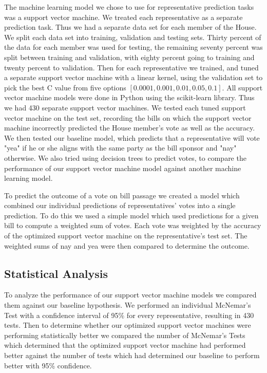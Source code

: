 \documentclass[11pt,letterpaper,twocolumn]{article}
\begin{document}
The machine learning model we chose to use for representative prediction tasks was a support vector machine. We treated each representative as a separate prediction task. Thus we had a separate data set for each member of the House. We split each data set into training, validation and testing sets. Thirty percent of the data for each member was used for testing, the remaining seventy percent was split between training and validation, with eighty percent going to training and twenty percent to validation. Then for each representative we trained, and tuned a separate support vector machine with a linear kernel, using the validation set to pick the best C value from five options $[0.0001, 0.001, 0.01, 0.05, 0.1]$. All support vector machine models were done in Python using the scikit-learn library. Thus we had 430 separate support vector machines. We tested each tuned support vector machine on the test set, recording the bills on which the support vector machine incorrectly predicted the House member's vote as well as the accuracy. We then tested our baseline model, which predicts that a representative will vote "yea" if he or she aligns with the same party as the bill sponsor and "nay" otherwise. We also tried using decision trees to predict votes, to compare the performance of our support vector machine model against another machine learning model.

To predict the outcome of a vote on bill passage we created a model which combined our individual predictions of representatives' votes into a single prediction. To do this we used a simple model which used predictions for a given bill to compute a weighted sum of votes. Each vote was weighted by the accuracy of the optimized support vector machine on the representative's test set. The weighted sums of nay and yea were then compared to determine the outcome.

\subsection{Statistical Analysis}

To analyze the performance of our support vector machine models we compared them against our baseline hypothesis. We performed an individual McNemar's Test with a confidence interval of 95\% for every representative, resulting in 430 tests. Then to determine whether our optimized support vector machines were performing statistically better we compared the number of McNemar's Tests which determined that the optimized support vector machine had performed better against the number of tests which had determined our baseline to perform better with 95\% confidence.
\end{document}
